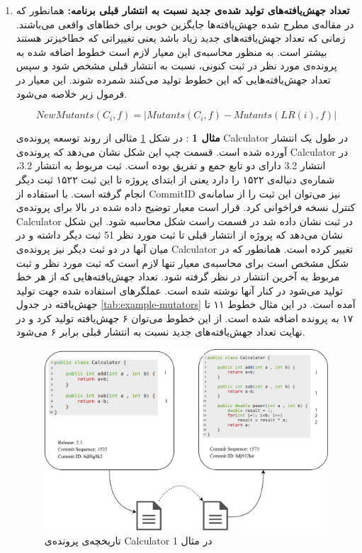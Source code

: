 \begin{enumerate}
	\item  
	\textbf{
		تعداد جهش‌یافته‌های تولید شده‌ی جدید نسبت به انتشار قبلی برنامه: }همانطور که در مقاله‌ی \cite{just2014mutants} مطرح شده جهش‌یافته‌ها جایگزین خوبی برای خطاهای واقعی می‌باشند. زمانی که تعداد جهش‌یافته‌های جدید زیاد باشد یعنی تغییراتی که خطا‌خیز‌تر هستند بیشتر است. به منظور محاسبه‌ی این معیار لازم است خطوط اضافه شده به پرونده‌ی مورد نظر در ثبت کنونی، نسبت به انتشار قبلی مشخص شود و سپس تعداد جهش‌یافته‌هایی که این خطوط تولید می‌کنند شمرده شوند. این معیار در فرمول زیر خلاصه می‌شود.
\begin{latin}
\[
NewMutants(C_i,f) = | Mutants(C_i,f) - Mutants(LR(i),f)|
\]
\end{latin}

	
\textbf{مثال 1} : 
در شکل \ref{fig:example1} مثالی  از روند توسعه پرونده‌ی  Calculator در طول یک انتشار آورده شده است. قسمت چپ این شکل نشان می‌دهد که پرونده‌ی Calculator در انتشار 3.2 دارای دو تابع جمع و تفریق بوده است. ثبت مربوط به انتشار 3.2،  شماره‌ی دنباله‌ی ۱۵۲۲ را دارد یعنی از ابتدای پروژه تا این ثبت ۱۵۲۲ ثبت دیگر انجام گرفته است. با استفاده از CommitID نیز می‌توان این ثبت را از سامانه‌ی کنترل نسخه فراخوانی کرد. قرار است معیار توضیح داده شده در بالا  برای  پرونده‌ی  Calculator در ثبت نشان داده شد در قسمت راست شکل محاسبه  شود. این شکل نشان می‌دهد که پروژه از انتشار قبلی تا ثبت مورد نظر 51 ثبت دیگر داشته و در میان  آنها در دو ثبت دیگر نیز پرونده‌ی Calculator تغییر کرده است. 
 همانطور که در شکل مشخص است برای محاسبه‌ی معیار تنها لازم است که ثبت مورد نظر و ثبت مربوط به آخرین انتشار در نظر گرفته شود. تعداد جهش‌یافته‌هایی که از هر خط تولید می‌شود در کنار آنها نوشته شده است. عملگرهای استفاده شده جهت تولید جهش‌یافته در جدول  \ref{tab:example-mutators} آمده است. در این مثال خطوط ۱۱ تا ۱۷ به پرونده اضافه شده است. از این خطوط می‌توان ۶ جهش‌یافته تولید کرد و در نهایت تعداد جهش‌یافته‌های جدید نسبت به انتشار قبلی برابر ۶ می‌شود. 

\begin{figure}[H]
	\centering
	\includegraphics[width=1\textwidth]{img/method/example1.png}
	\caption{ تاریخچه‌ی پرونده‌ی Calculator در مثال 1}
	\label{fig:example1}
\end{figure}




\end{enumerate}
